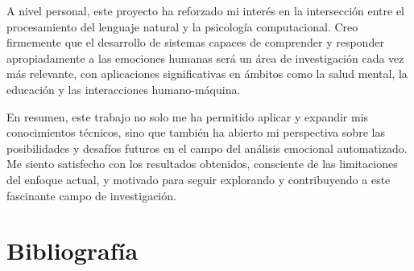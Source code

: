 \documentclass[12pt,a4paper]{report}
\begin{document}
A nivel personal, este proyecto ha reforzado mi interés en la intersección entre el procesamiento del lenguaje natural y la psicología computacional. Creo firmemente que el desarrollo de sistemas capaces de comprender y responder apropiadamente a las emociones humanas será un área de investigación cada vez más relevante, con aplicaciones significativas en ámbitos como la salud mental, la educación y las interacciones humano-máquina.

En resumen, este trabajo no solo me ha permitido aplicar y expandir mis conocimientos técnicos, sino que también ha abierto mi perspectiva sobre las posibilidades y desafíos futuros en el campo del análisis emocional automatizado. Me siento satisfecho con los resultados obtenidos, consciente de las limitaciones del enfoque actual, y motivado para seguir explorando y contribuyendo a este fascinante campo de investigación.

\chapter{Bibliografía}
\end{document}
